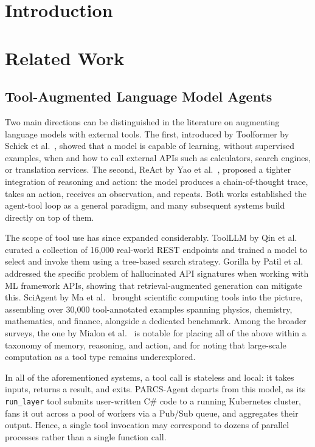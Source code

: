 \documentclass[preprints,article,submit,pdftex,moreauthors]{Definitions/mdpi}
\begin{document}
\section{Introduction}

\section{Related Work}
\label{sec:related}

\subsection{Tool-Augmented Language Model Agents}

Two main directions can be distinguished in the literature on augmenting language models with external tools. The first, introduced by Toolformer by Schick et al.~\citep{ref-toolformer}, showed that a model is capable of learning, without supervised examples, when and how to call external APIs such as calculators, search engines, or translation services. The second, ReAct by Yao et al.~\citep{ref-react}, proposed a tighter integration of reasoning and action: the model produces a chain-of-thought trace, takes an action, receives an observation, and repeats. Both works established the agent-tool loop as a general paradigm, and many subsequent systems build directly on top of them.

The scope of tool use has since expanded considerably. ToolLLM by Qin et al.~\citep{ref-toolllm} curated a collection of 16{,}000 real-world REST endpoints and trained a model to select and invoke them using a tree-based search strategy. Gorilla by Patil et al.~\citep{ref-gorilla} addressed the specific problem of hallucinated API signatures when working with ML framework APIs, showing that retrieval-augmented generation can mitigate this. SciAgent by Ma et al.~\citep{ref-sciagent} brought scientific computing tools into the picture, assembling over 30{,}000 tool-annotated examples spanning physics, chemistry, mathematics, and finance, alongside a dedicated benchmark. Among the broader surveys, the one by Mialon et al.~\citep{ref-augmented-survey} is notable for placing all of the above within a taxonomy of memory, reasoning, and action, and for noting that large-scale computation as a tool type remains underexplored.

In all of the aforementioned systems, a tool call is stateless and local: it takes inputs, returns a result, and exits. PARCS-Agent departs from this model, as its \texttt{run\_layer} tool submits user-written C\# code to a running Kubernetes cluster, fans it out across a pool of workers via a Pub/Sub queue, and aggregates their output. Hence, a single tool invocation may correspond to dozens of parallel processes rather than a single function call.
\end{document}
